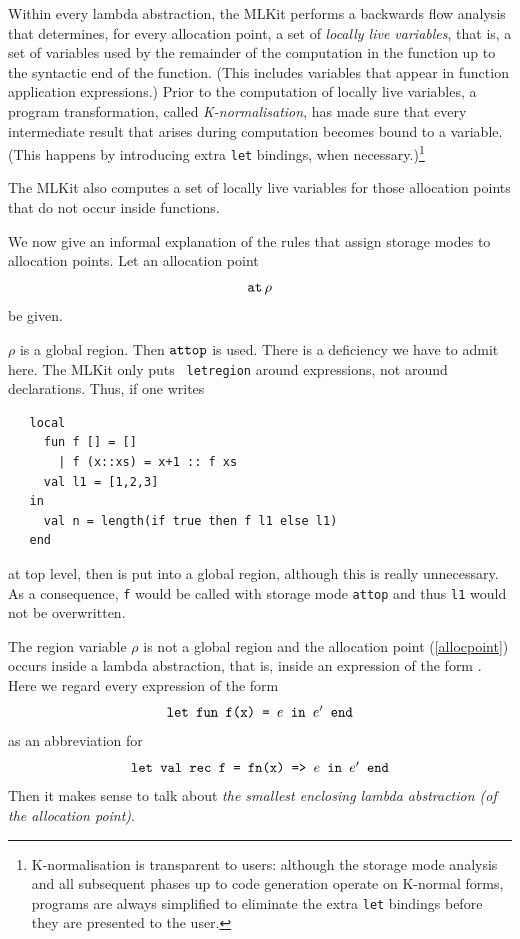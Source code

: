 \documentclass[12pt]{book}
\begin{document}
Within every lambda abstraction, the MLKit performs a backwards flow
analysis that determines, for every allocation point, a set of
%
{\em locally live variables}, that is, a set of variables used by the
remainder of the computation in the function up to the syntactic end
of the function. (This includes variables that appear in function
application expressions.) Prior to the computation of locally live
variables, a program transformation, called
%
\label{K-normal-form}%
{\em K-normalisation}, has made sure that every intermediate result
that arises during computation becomes bound to a variable. (This
happens by introducing extra {\tt let} bindings, when
necessary.)\footnote{K-normalisation is transparent to users: although
  the storage mode analysis and all subsequent phases up to code
  generation operate on K-normal forms, programs are always simplified
  to eliminate the extra {\tt let} bindings before they are presented
  to the user.}

The MLKit also computes a set of locally live variables for those
allocation points that do not occur inside functions.

We now give an informal explanation of the rules that assign storage
modes to allocation points.  Let an allocation point
\begin{equation}
\label{allocpoint}\mathbin{\hbox{\tt at}}\,\rho
\end{equation}
be given. 
\bigskip

 $\rho$ is a global region. Then $\hbox{\tt attop}$ is used. 
There is a deficiency we have to admit here. The MLKit only puts {\tt
  letregion} around expressions, not around declarations. Thus, if one
writes
\begin{verbatim}
   local 
     fun f [] = []
       | f (x::xs) = x+1 :: f xs
     val l1 = [1,2,3]
   in
     val n = length(if true then f l1 else l1)
   end
\end{verbatim}

\noindent
at top level, then  is put into a global region, although
this is really unnecessary. As a consequence, {\tt f} would be called
with storage mode {\tt attop} and thus {\tt l1} would not be
overwritten.  \bigskip

The region variable $\rho$ is not a global region and the allocation
point (\ref{allocpoint}) occurs inside a lambda abstraction, that is,
inside an expression of the form .  Here we
regard every expression of the form
$$\hbox{\tt let fun f(x) = $e$ in $e'$ end}$$ as an abbreviation for
$$\hbox{\tt let val rec f = fn(x) => $e$ in $e'$ end}$$
Then it makes
sense to talk about {\em the smallest enclosing lambda abstraction (of
  the allocation point)}.
\end{document}
